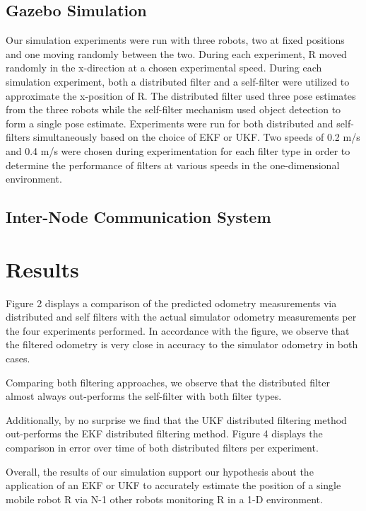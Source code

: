 \documentclass[conference]{IEEEtran}
\begin{document}
\subsection{Gazebo Simulation}
Our simulation experiments were run with three robots, two at fixed positions and one moving randomly between the two. 
During each experiment, R moved randomly in the x-direction at a chosen experimental speed. During each simulation 
experiment, both a distributed filter and a self-filter were utilized to approximate the x-position of R. 
The distributed filter used three pose estimates from the three robots while the self-filter mechanism used object 
detection to form a single pose estimate. Experiments were run for both distributed and self-filters simultaneously 
based on the choice of EKF or UKF. Two speeds of 0.2 m/s and 0.4 m/s were chosen during experimentation for each filter 
type in order to determine the performance of filters at various speeds in the one-dimensional environment.
\subsection{Inter-Node Communication System}

\section{Results}
Figure 2 displays a comparison of the predicted odometry measurements via distributed and self filters with the actual 
simulator odometry measurements per the four experiments performed. In accordance with the figure, we observe that the 
filtered odometry is very close in accuracy to the simulator odometry in both cases.

 Comparing both filtering approaches, we observe that the distributed filter almost always out-performs the self-filter 
 with both filter types.

Additionally, by no surprise we find that the UKF distributed filtering method out-performs the EKF distributed 
filtering method. Figure 4 displays the comparison in error over time of both distributed filters per experiment.

Overall, the results of our simulation support our hypothesis about the application of an EKF or UKF to accurately 
estimate the position of a single mobile robot R via N-1 other robots monitoring R in a 1-D environment. 
\end{document}
